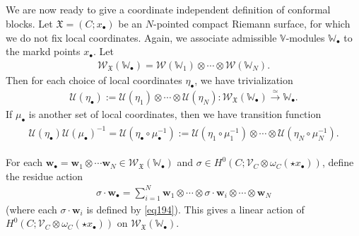 \documentclass[11pt,b5paper,notitlepage]{article}
\theoremstyle{definition}
\theoremstyle{plain}
\newcommand{\fk}{\mathfrak}
\newcommand{\mc}{\mathcal}
\newcommand{\scr}{\mathscr}
\newcommand{\blt}{\bullet}
\newcommand{\Vbb}{\mathbb V}
\newcommand{\Wbb}{\mathbb W}
\newcommand{\wbf}{\mathbf w}
\numberwithin{equation}{section}
\begin{document}
\subsection{}\label{lb124}


We are now ready to give a coordinate independent definition of conformal blocks. Let $\fk X=(C;x_\blt)$ be an $N$-pointed compact Riemann surface, for which we do not fix local coordinates. Again, we associate admissible $\Vbb$-modules $\Wbb_\blt$ to the markd points $x_\blt$. Let  \index{W@$\scr W(\Wbb_i)$, $\scr W_{\fk X}(\Wbb_\blt)$}
\begin{align}
\scr W_{\fk X}(\Wbb_\blt)=\scr W(\Wbb_1)\otimes\cdots\otimes\scr W(\Wbb_N).
\end{align}
Then for each choice of local coordinates $\eta_\blt$, we have trivialization \index{U@$\mc U(\alpha),\mc U(\eta),\mc U(\eta_\blt)$}
\begin{align}
\mc U(\eta_\blt):=\mc U(\eta_1)\otimes\cdots\otimes\mc U(\eta_N):\scr W_{\fk X}(\Wbb_\blt)\xrightarrow{\simeq}\Wbb_\blt.
\end{align}
If $\mu_\blt$ is another set of local coordinates, then we have transition function
\begin{align}\label{eq225}
\begin{aligned}
\mc U(\eta_\blt)\mc U(\mu_\blt)^{-1}=\mc U(\eta_\blt\circ\mu_\blt^{-1}):=\mc U(\eta_1\circ\mu_1^{-1})\otimes\cdots\otimes\mc U(\eta_N\circ\mu_N^{-1}).
\end{aligned}
\end{align}


For each $\wbf_\blt=\wbf_1\otimes\cdots\wbf_N\in\scr W_{\fk X}(\Wbb_\blt)$ and $\sigma\in H^0(C;\scr V_C\otimes\omega_C(\star x_\blt))$, define the residue action
\begin{align}
\sigma\cdot\wbf_\blt=\sum_{i=1}^N \wbf_1\otimes\cdots\otimes \sigma\cdot \wbf_i\otimes\cdots\otimes \wbf_N
\end{align}
(where each $\sigma\cdot \wbf_i$ is defined by \eqref{eq194}). This gives a linear action of $H^0(C;\scr V_C\otimes\omega_C(\star x_\blt))$ on $\scr W_{\fk X}(\Wbb_\blt)$.
\end{document}
